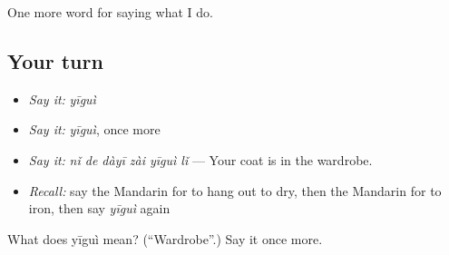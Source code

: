 \begin{grammarlens}[title={What you've built}]
One more word for saying what I do.
\end{grammarlens}

\subsection*{Your turn}
\begin{itemize}
\raggedright
  \item \emph{Say it:} \emph{yīguì}
  \item \emph{Say it:} \emph{yīguì}, once more
  \item \emph{Say it:} \emph{nǐ de dàyī zài yīguì lǐ} — Your coat is in the wardrobe.
  \item \emph{Recall:} say the Mandarin for to hang out to dry, then the Mandarin for to iron, then say \emph{yīguì} again
\end{itemize}

\begin{tcolorbox}[breakable,colback=teal!4,colframe=teal!35!black,title={Before you move on}]
What does yīguì mean? (\textquotedblleft{}Wardrobe\textquotedblright{}.) Say it once more.
\end{tcolorbox}
